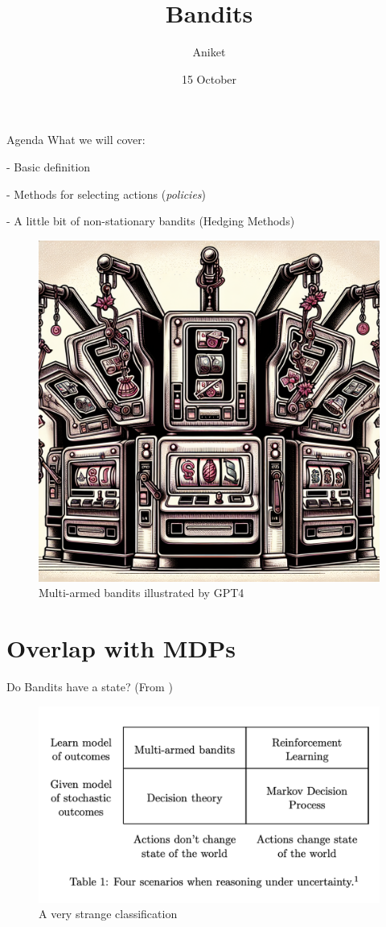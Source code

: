 \documentclass[usenames,dvipsnames]{beamer}
\title[Seminar]{Bandits}
\author[AJ]{Aniket}
\institute[U-M]{University of Michigan}
\date{15 October}
\theoremstyle{definition}
\let\oldcite=\cite
\renewcommand{\cite}[2][]{\textcolor{green}{\oldcite[#1]{#2}}}
\begin{document}
\begin{frame}[plain]
\titlepage %
\end{frame}

\begin{frame}[plain]{Agenda}
  What we will cover:

  - Basic definition

  - Methods for selecting actions (\emph{policies})

  - A little bit of non-stationary bandits (Hedging Methods)

  \begin{figure}
    \centering
    \includegraphics[width=0.3\linewidth]{bandit_gpt.png}
    \caption{Multi-armed bandits illustrated by GPT4}
  \end{figure}
\end{frame}

\section{Overlap with MDPs}

\begin{frame}{Do Bandits have a state?}
  (From \cite{zhou_survey_2015})

  \begin{figure}[H]
    \centering
    \includegraphics[width=\textwidth]{zhou2015_bandits.png}
    \caption{A very strange classification}
  \end{figure}
\end{frame}
\end{document}
